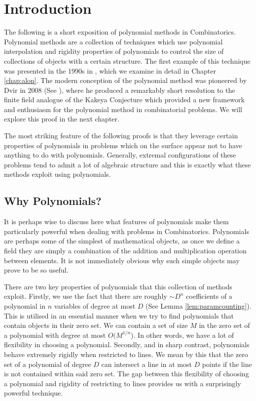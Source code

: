\chapter{Introduction}
The following is a short exposition of polynomial methods in Combinatorics. Polynomial methods are a collection of techniques which use polynomial interpolation and rigidity properties
of polynomials to control the size of collections of objects with a certain structure. 
The first example of this technique was presented in the 1990s in \cite{alon1999combinatorial},  which we examine in detail
in Chapter \ref{chap:alon}. The modern conception of the polynomial method was pioneered by Dvir in 2008 (See \cite{2008DVIR}), where he produced a remarkably short resolution to the finite field analogue of the Kakeya Conjecture which provided
a new framework and enthusiasm for the polynomial method in combinatorial problems. We will explore this proof in the next chapter. 

The most striking feature of the following proofs is that they leverage certain properties of polynomials in problems which on the surface appear not to have anything to 
do with polynomials. Generally, extremal configurations of these problems tend to admit a lot of algebraic structure and this is exactly what these methods exploit using polynomials. 


\section{Why Polynomials?}
It is perhaps wise to discuss here what features of polynomials make them particularly powerful when dealing with problems in Combinatorics. 
Polynomials are perhaps some of the simplest of mathematical objects, as once we define a field they are simply a combination of the addition and multiplication operation between elements. 
It is not immediately obvious why such simple objects may prove to be so useful.

There are two key properties of polynomials that this collection of methods exploit.
Firstly, we use the fact that there are roughly $\sim D^n$ coefficients of a polynomial in $n$ variables of degree at most $D$ (See Lemma \ref{lem:paramcounting}).  This is utilised 
in an essential manner when we try to find polynomials that contain objects in their zero set. We can contain a set of size $M$ in the zero set of
a polynomial with degree at most $O(M^{1/n}$). In other words, we have a lot of flexibility in choosing a polynomial.
Secondly, and in sharp contrast, polynomials behave extremely rigidly when restricted to lines. We mean by this that the zero set of a polynomial of degree $D$ can intersect 
a line in at most $D$ points if the line is not contained within said zero set. The gap between this flexibility of choosing a polynomial and rigidity of restricting to lines provides
us with a surprisingly powerful technique. 

